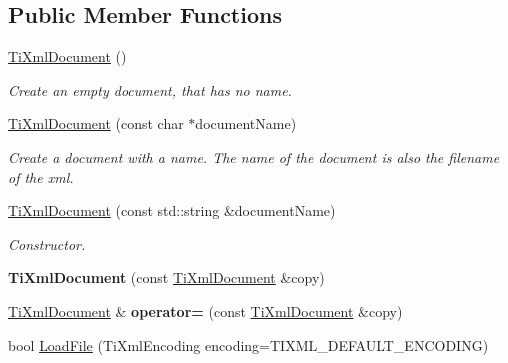 \subsection*{Public Member Functions}
\begin{DoxyCompactItemize}
\item 
\mbox{\label{class_ti_xml_document_a9f5e84335708fde98400230f9f12659c}} 
\hyperlink{class_ti_xml_document_a9f5e84335708fde98400230f9f12659c}{Ti\+Xml\+Document} ()
\begin{DoxyCompactList}\small\item\em Create an empty document, that has no name. \end{DoxyCompactList}\item 
\mbox{\label{class_ti_xml_document_ae4508b452d0c3061db085f3db27b8396}} 
\hyperlink{class_ti_xml_document_ae4508b452d0c3061db085f3db27b8396}{Ti\+Xml\+Document} (const char $\ast$document\+Name)
\begin{DoxyCompactList}\small\item\em Create a document with a name. The name of the document is also the filename of the xml. \end{DoxyCompactList}\item 
\mbox{\label{class_ti_xml_document_a2c6e58fb99bfa76cc613f16840022225}} 
\hyperlink{class_ti_xml_document_a2c6e58fb99bfa76cc613f16840022225}{Ti\+Xml\+Document} (const std\+::string \&document\+Name)
\begin{DoxyCompactList}\small\item\em Constructor. \end{DoxyCompactList}\item 
\mbox{\label{class_ti_xml_document_a323a7486e7da6099cdc19a5ff7e74b07}} 
{\bfseries Ti\+Xml\+Document} (const \hyperlink{class_ti_xml_document}{Ti\+Xml\+Document} \&copy)
\item 
\mbox{\label{class_ti_xml_document_aa56fd4dbe8917d2033d865909e2d737e}} 
\hyperlink{class_ti_xml_document}{Ti\+Xml\+Document} \& {\bfseries operator=} (const \hyperlink{class_ti_xml_document}{Ti\+Xml\+Document} \&copy)
\item 
bool \hyperlink{class_ti_xml_document_a4c852a889c02cf251117fd1d9fe1845f}{Load\+File} (Ti\+Xml\+Encoding encoding=T\+I\+X\+M\+L\+\_\+\+D\+E\+F\+A\+U\+L\+T\+\_\+\+E\+N\+C\+O\+D\+I\+NG)

\end{DoxyCompactItemize}
